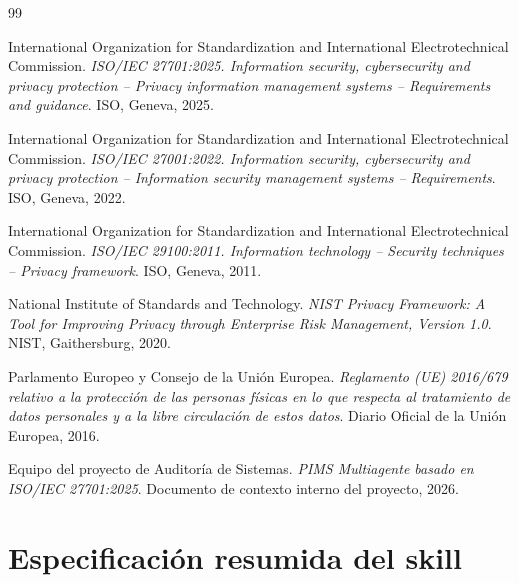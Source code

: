 \documentclass[11pt,a4paper]{article}
\begin{document}
\clearpage

\begin{thebibliography}{99}

International Organization for Standardization and International Electrotechnical Commission.
\textit{ISO/IEC 27701:2025. Information security, cybersecurity and privacy protection -- Privacy information management systems -- Requirements and guidance}.
ISO, Geneva, 2025.

International Organization for Standardization and International Electrotechnical Commission.
\textit{ISO/IEC 27001:2022. Information security, cybersecurity and privacy protection -- Information security management systems -- Requirements}.
ISO, Geneva, 2022.

International Organization for Standardization and International Electrotechnical Commission.
\textit{ISO/IEC 29100:2011. Information technology -- Security techniques -- Privacy framework}.
ISO, Geneva, 2011.

National Institute of Standards and Technology.
\textit{NIST Privacy Framework: A Tool for Improving Privacy through Enterprise Risk Management, Version 1.0}.
NIST, Gaithersburg, 2020.

Parlamento Europeo y Consejo de la Unión Europea.
\textit{Reglamento (UE) 2016/679 relativo a la protección de las personas físicas en lo que respecta al tratamiento de datos personales y a la libre circulación de estos datos}.
Diario Oficial de la Unión Europea, 2016.

Equipo del proyecto de Auditoría de Sistemas.
\textit{PIMS Multiagente basado en ISO/IEC 27701:2025}.
Documento de contexto interno del proyecto, 2026.

\end{thebibliography}

\clearpage
\appendix

\section{Especificación resumida del skill}
\end{document}
